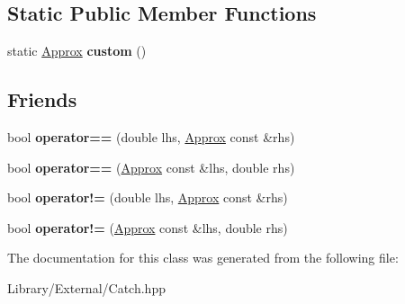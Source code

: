 \subsection*{Static Public Member Functions}
\begin{DoxyCompactItemize}
\item 
\hypertarget{class_catch_1_1_detail_1_1_approx_aaf86dc0ee92272ac2d9839197a07951d}{}static \hyperlink{class_catch_1_1_detail_1_1_approx}{Approx} {\bfseries custom} ()\label{class_catch_1_1_detail_1_1_approx_aaf86dc0ee92272ac2d9839197a07951d}

\end{DoxyCompactItemize}
\subsection*{Friends}
\begin{DoxyCompactItemize}
\item 
\hypertarget{class_catch_1_1_detail_1_1_approx_ac766f044f1c63f0c5997982baefd9049}{}bool {\bfseries operator==} (double lhs, \hyperlink{class_catch_1_1_detail_1_1_approx}{Approx} const \&rhs)\label{class_catch_1_1_detail_1_1_approx_ac766f044f1c63f0c5997982baefd9049}

\item 
\hypertarget{class_catch_1_1_detail_1_1_approx_a35999631e6cef569f9da9f3fa910db22}{}bool {\bfseries operator==} (\hyperlink{class_catch_1_1_detail_1_1_approx}{Approx} const \&lhs, double rhs)\label{class_catch_1_1_detail_1_1_approx_a35999631e6cef569f9da9f3fa910db22}

\item 
\hypertarget{class_catch_1_1_detail_1_1_approx_a83b3763569a7ecc143c335b630be0e47}{}bool {\bfseries operator!=} (double lhs, \hyperlink{class_catch_1_1_detail_1_1_approx}{Approx} const \&rhs)\label{class_catch_1_1_detail_1_1_approx_a83b3763569a7ecc143c335b630be0e47}

\item 
\hypertarget{class_catch_1_1_detail_1_1_approx_a7497ef839f8026cc0edd6269a80f3e09}{}bool {\bfseries operator!=} (\hyperlink{class_catch_1_1_detail_1_1_approx}{Approx} const \&lhs, double rhs)\label{class_catch_1_1_detail_1_1_approx_a7497ef839f8026cc0edd6269a80f3e09}

\end{DoxyCompactItemize}


The documentation for this class was generated from the following file\+:\begin{DoxyCompactItemize}
\item 
Library/\+External/Catch.\+hpp\end{DoxyCompactItemize}
